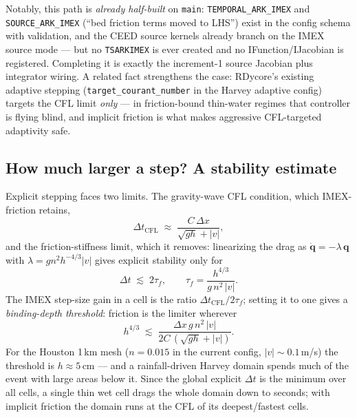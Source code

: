 \documentclass[11pt]{article}
\begin{document}
Notably, this path is \emph{already half-built} on \texttt{main}:
\texttt{TEMPORAL\_ARK\_IMEX} and \texttt{SOURCE\_ARK\_IMEX} (``bed
friction terms moved to LHS'') exist in the config schema with
validation, and the CEED source kernels already branch on the IMEX
source mode --- but no \texttt{TSARKIMEX} is ever created and no
IFunction/IJacobian is registered. Completing it is exactly the
increment-1 source Jacobian plus integrator wiring. A related fact
strengthens the case: RDycore's existing adaptive stepping
(\texttt{target\_courant\_number} in the Harvey adaptive config)
targets the CFL limit \emph{only} --- in friction-bound thin-water
regimes that controller is flying blind, and implicit friction is what
makes aggressive CFL-targeted adaptivity safe.

\subsection*{How much larger a step? A stability estimate}

Explicit stepping faces two limits. The gravity-wave CFL condition,
which IMEX-friction retains,
\begin{equation}
  \Delta t_{\mathrm{CFL}} \;\approx\; \frac{C\,\Delta x}{\sqrt{gh} + |v|},
  \label{eq:cfl}
\end{equation}
and the friction-stiffness limit, which it removes: linearizing the
drag as $\dot{\mathbf q} = -\lambda\,\mathbf q$ with
$\lambda = g n^2 h^{-4/3}|v|$ gives explicit stability only for
\begin{equation}
  \Delta t \;\lesssim\; 2\tau_f, \qquad
  \tau_f = \frac{h^{4/3}}{g\,n^2\,|v|}.
  \label{eq:taufric}
\end{equation}
The IMEX step-size gain in a cell is the ratio
$\Delta t_{\mathrm{CFL}}/2\tau_f$; setting it to one gives a
\emph{binding-depth threshold}: friction is the limiter wherever
\begin{equation}
  h^{4/3} \;\lesssim\; \frac{\Delta x\, g\, n^2\, |v|}
                            {2C\,(\sqrt{gh}+|v|)} .
  \label{eq:threshold}
\end{equation}
For the Houston 1\,km mesh ($n=0.015$ in the current config,
$|v|\sim0.1$\,m/s) the threshold is $h \approx 5$\,cm --- and a
rainfall-driven Harvey domain spends much of the event with large areas
below it. Since the global explicit $\Delta t$ is the minimum over all
cells, a single thin wet cell drags the whole domain down to seconds;
with implicit friction the domain runs at the CFL of its
deepest/fastest cells.
\end{document}
